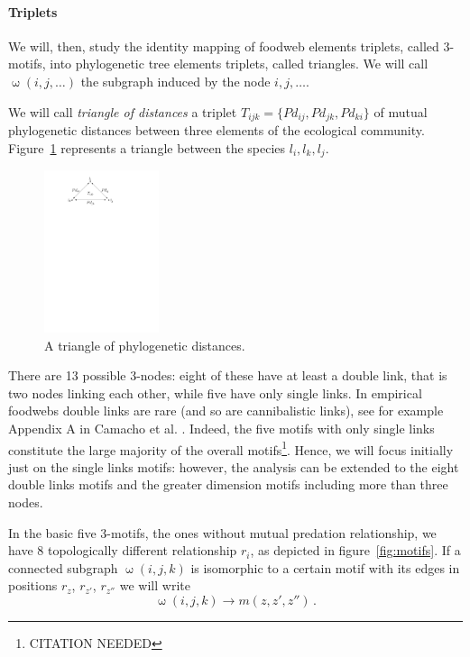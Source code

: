 \documentclass[12pt,a4paper]{report}
\begin{document}
\paragraph{Triplets}
We will, then, study the identity mapping of foodweb elements triplets, called 3-motifs, into phylogenetic tree elements triplets, called triangles. We will call $\upomega(i,j,\dots)$ the subgraph induced by the node $i,j,\dots$.

We will call \emph{triangle of distances} a triplet $T_{ijk}=\{Pd_{ij},Pd_{jk},Pd_{ki}\}$ of mutual phylogenetic distances between three elements of the ecological community. Figure~\ref{fig:phylogenetictriplets} represents a triangle between the species $l_i, l_k, l_j$.

\begin{figure}[ht]
	\centering
		\includegraphics[width=0.3\textwidth]{images/phylogenetictriplets}
		\caption{A triangle of phylogenetic distances.}
		\label{fig:phylogenetictriplets}
\end{figure}

There are 13 possible 3-nodes: eight of these have at least a double link, that is two nodes linking each other, while five have only single links. In empirical foodwebs double links are rare (and so are cannibalistic links), see for example Appendix A in Camacho et al. \cite{camacho_quantitative_2007}. Indeed, the five motifs with only single links constitute the large majority of the overall motifs\footnote{CITATION NEEDED}. Hence, we will focus initially just on the single links motifs: however, the analysis can be extended to the eight double links motifs and the greater dimension motifs including more than three nodes.

In the basic five 3-motifs, the ones without mutual predation relationship, we have 8 topologically different relationship $r_i$, as depicted in figure~\ref{fig:motifs}. If a connected subgraph $\upomega(i,j,k)$ is isomorphic to a certain motif with its edges in positions $r_z$, $r_{z'}$, $r_{z''}$ we will write \[\upomega(i,j,k) \to m(z,z',z'') \, .\]
\end{document}
